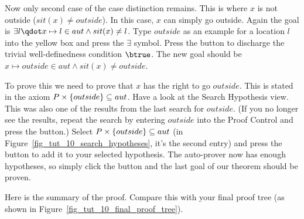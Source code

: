 Now only second case of the case distinction remains. This is where $x$ is not outside ($sit(x)\neq outside$). In this case, $x$ can simply go outside.
Again the goal is $\exists l\qdot x\mapsto l\in aut \land sit(x)\neq l$. Type
$outside$ as an example for a location $l$ into the yellow box and press
the $\exists$ symbol.
Press  the  button to discharge the trivial well-definedness condition $\btrue$.
The new goal should be $x \mapsto outside\in aut \land sit(x)\neq outside$.

To prove this we need to prove that $x$ has the right to go $outside$.
This is stated in the axiom $P \mathbin\times\{outside\}\subseteq aut$.
Have a look at the \textsf{Search Hypothesis} view. This was also one of the results from the last search for $outside$.
(If you no longer see the results, repeat the search by entering $outside$ into the \textsf{Proof Control} and press the  button.)
Select $P \mathbin\times\{outside\}\subseteq aut$ (in Figure~\ref{fig_tut_10_search_hypotheses}, it's the second entry) and
  press the  button to add it to your selected hypothesis. The auto-prover now has enough hypotheses, so simply click the  button and
  the last goal of our theorem should be proven.

Here is the summary of the proof. Compare this with your final proof tree (as shown in 
Figure~\ref{fig_tut_10_final_proof_tree}).

